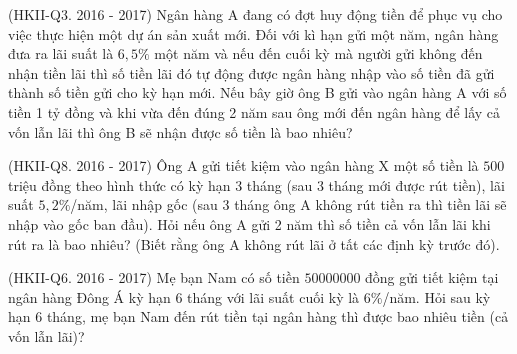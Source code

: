 \begin{bt}%
	{(HKII-Q3. 2016 - 2017)} Ngân hàng A đang có đợt huy động tiền để phục vụ cho việc thực hiện một dự án sản xuất mới. Đối với kì hạn gửi một năm, ngân hàng đưa ra lãi suất là $6{,}5\%$ một năm và nếu đến cuối kỳ mà người gửi không đến nhận tiền lãi thì số tiền lãi đó tự động được ngân hàng nhập vào số tiền đã gửi thành số tiền gửi cho kỳ hạn mới. Nếu bây giờ ông B gửi vào ngân hàng A với số tiền 1 tỷ đồng và khi vừa đến đúng 2 năm sau ông mới đến ngân hàng để lấy cả vốn lẫn lãi thì ông B sẽ nhận được số tiền là bao nhiêu?
\end{bt}

\begin{bt}%
	{(HKII-Q8. 2016 - 2017)} Ông A gửi tiết kiệm vào ngân hàng X một số tiền là $500$ triệu đồng theo hình thức có kỳ hạn 3 tháng (sau 3 tháng mới được rút tiền), lãi suất $5{,}2\%$/năm, lãi nhập gốc (sau 3 tháng ông A không rút tiền ra thì tiền lãi sẽ nhập vào gốc ban đầu). Hỏi nếu ông A gửi 2 năm thì số tiền cả vốn lẫn lãi khi rút ra là bao nhiêu? (Biết rằng ông A không rút lãi ở tất các định kỳ trước đó). 
\end{bt}

\begin{bt}%
	{(HKII-Q6. 2016 - 2017)} Mẹ bạn Nam có số tiền $50 000 000$ đồng gửi tiết kiệm tại ngân hàng Đông Á kỳ hạn 6 tháng với lãi suất cuối kỳ là $6\%$/năm. Hỏi sau kỳ hạn 6 tháng, mẹ bạn Nam đến rút tiền tại ngân hàng thì được bao nhiêu tiền (cả vốn lẫn lãi)?
\end{bt}

